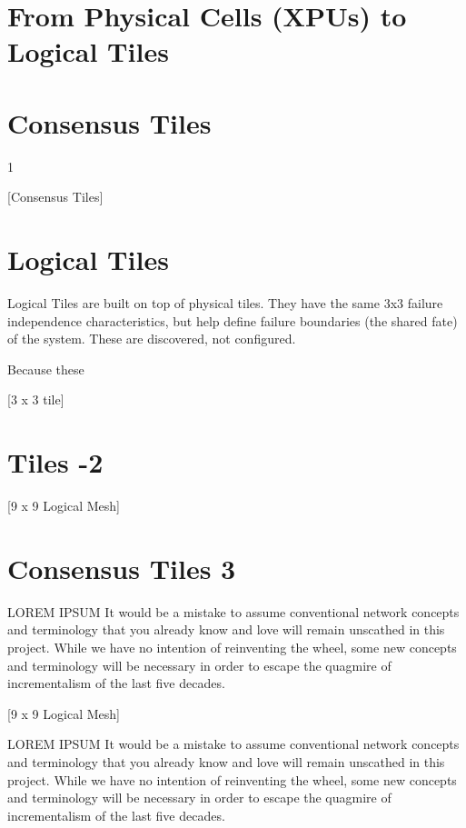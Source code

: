 \documentclass[../../../OAE-SPEC-MAIN.tex]{subfiles}
\begin{document}
\clearpage


\section{From Physical Cells (XPUs) to Logical Tiles}

\section{Consensus Tiles} 1

[Consensus Tiles]

\section{Logical Tiles}

Logical Tiles are built on top of physical tiles.  They have the same 3x3 failure independence characteristics, but help define failure boundaries (the shared fate) of the system. These are discovered, not configured.  

Because these 


[3 x 3 tile]

\section{Tiles -2}

[9 x 9 Logical Mesh]

\section{Consensus Tiles 3}

LOREM IPSUM It would be a mistake to assume conventional network concepts and terminology that you already know and love will remain unscathed in this project. While we have no intention of reinventing the wheel,  some new concepts and terminology will be necessary in order to escape the quagmire of incrementalism of the last five decades.  

[9 x 9 Logical Mesh]

LOREM IPSUM It would be a mistake to assume conventional network concepts and terminology that you already know and love will remain unscathed in this project. While we have no intention of reinventing the wheel,  some new concepts and terminology will be necessary in order to escape the quagmire of incrementalism of the last five decades.  
\end{document}
